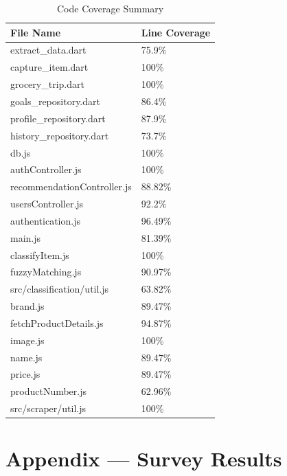 \documentclass[12pt, titlepage]{article}
\begin{document}
\begin{table}[H]
  \centering
  \caption{Code Coverage Summary} \label{Code Coverage Summary}
  \begin{tabular}{|l|l|}
    \hline
    \textbf{File Name} & \textbf{Line Coverage} \\
    \hline
    extract\_data.dart & 75.9\% \\
    \hline
    capture\_item.dart & 100\% \\
    \hline
    grocery\_trip.dart & 100\% \\
    \hline
    goals\_repository.dart & 86.4\% \\
    \hline
    profile\_repository.dart & 87.9\% \\
    \hline
    history\_repository.dart & 73.7\% \\
    \hline
    db.js & 100\% \\
    \hline
    authController.js & 100\% \\
    \hline
    recommendationController.js & 88.82\% \\
    \hline
    usersController.js & 92.2\% \\
    \hline
    authentication.js & 96.49\% \\
    \hline
    main.js & 81.39\% \\
    \hline
    classifyItem.js & 100\% \\
    \hline
    fuzzyMatching.js & 90.97\% \\
    \hline
    src/classification/util.js & 63.82\% \\
    \hline
    brand.js & 89.47\% \\
    \hline
    fetchProductDetails.js & 94.87\% \\
    \hline
    image.js & 100\% \\
    \hline
    name.js & 89.47\% \\
    \hline
    price.js & 89.47\% \\
    \hline
    productNumber.js & 62.96\% \\
    \hline
    src/scraper/util.js & 100\% \\
    \hline 
  \end{tabular}
\end{table}




\newpage{}
\section{Appendix --- Survey Results}
\end{document}

